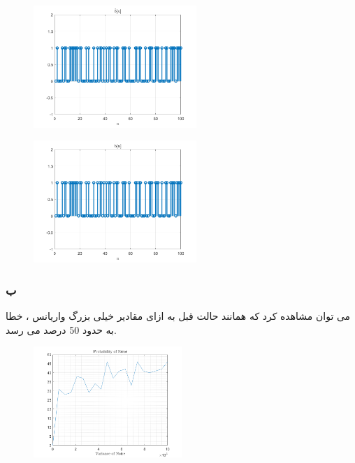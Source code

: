 \documentclass[a4paper]{article}
\begin{document}
\begin{figure}[H]
	\centering
	\end{figure}\begin{figure}[H]
	\includegraphics[width=0.55\textwidth]{comsys_fig31.png}\\ 
	\centering
	\end{figure}\begin{figure}[H]
	\includegraphics[width=0.55\textwidth]{comsys_fig32.png}\\ 
	\centering
	\end{figure}
	\subsubsection*{ب}
	می توان مشاهده کرد که همانند حالت قبل به ازای مقادیر خیلی بزرگ واریانس ، خطا به حدود 50 درصد می رسد.
	\newline
	\begin{figure}[H]
		\includegraphics[width=0.5\textwidth]{comsys_fig33.png}\\ 
		\centering
	\end{figure}
\end{document}
